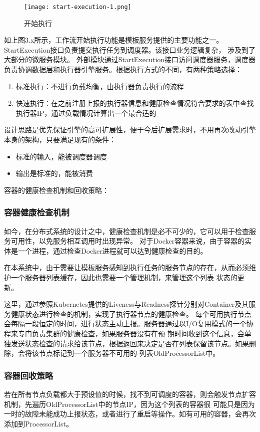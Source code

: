 \begin{figure}[H]
\centering
\texttt{[image: start-execution-1.png]}
\caption{开始执行}
\label{fig:kszx}
\end{figure}

如上图3.x所示，工作流开始执行功能是模板服务提供的主要功能之一。StartExecution接口负责提交执行任务到调度器。该接口业务逻辑复杂，
涉及到了大部分的微服务模块。 外部模块通过StartExecution接口访问调度器服务，调度器负责协调数据层和执行器引擎服务。根据执行方式的不同，有两种策略选择：

\begin{enumerate}
    \item 标准执行：不进行负载均衡，由执行器负责执行的流程
    \item 快速执行：在之前注册上报的执行器信息和健康检查情况符合要求的表中查找执行器IP，通过负载情况计算出一个最合适的
\end{enumerate}


设计思路是优先保证引擎的高可扩展性，便于今后扩展需求时，不用再次改动引擎本身的架构，只要满足现有的条件：
\begin{itemize}
    \item 标准的输入，能被调度器调度
    \item 输出是标准的，能被消费
\end{itemize}

容器的健康检查机制和回收策略：
\subsubsection{容器健康检查机制}

如今，在分布式系统的设计之中，健康检查机制是必不可少的，它可以用于检查服务可用性，以免服务相互调用时出现异常。
对于Docker容器来说，由于容器的实体是一个进程，通过检查Docker进程就可以达到健康检查的目的。

在本系统中，由于需要让模板服务感知到执行任务的服务节点的存在，从而必须维护一个服务器列表缓存，因此也需要一个管理机制，来管理这个列表
状态的更新。

这里，通过参照Kubernetes提供的Liveness与Readness探针分别对Container及其服务健康状态进行检查的机制\cite{wfwr442}，实现了执行器节点的健康检查。
每个可用执行节点会每隔一段恒定的时间，进行状态主动上报。服务器通过以I/O复用模式的一个协程来专门负责集群的健康检查，如果服务器没有在预
期时间收到这个信息，会单独发送状态检查的请求给该节点，根据返回来决定是否在列表保留该节点。如果删除，会将该节点标记到一个服务器不可用的
列表OldProcessorList中。

\subsubsection{容器回收策略}
若在所有节点负载都大于预设值的时候，找不到可调度的容器，则会触发节点扩容机制，先遍历OldProcessorList中的节点IP，因为这个列表的容器很
可能只是因为一时的故障未能成功上报状态，或者进行了重启等操作。如有可用的容器，会再次添加到ProcessorList。

